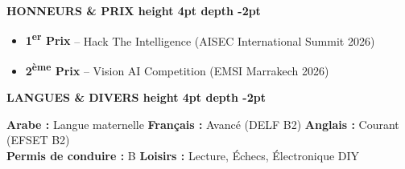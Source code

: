 \documentclass[10pt,a4paper]{altacv}
\renewcommand{\cvsection}[2][]{%
  \medskip%
  {\color{heading}\LARGE\bfseries #2 \hspace{0.2em}\leaders\vrule height 4pt depth -2pt\hfill\mbox{}}\par\smallskip
}
\begin{document}
\cvsection{HONNEURS \& PRIX}
\begin{itemize}
  \item \textbf{1\textsuperscript{er} Prix} -- Hack The Intelligence (AISEC International Summit 2026)
  \item \textbf{2\textsuperscript{ème} Prix} -- Vision AI Competition (EMSI Marrakech 2026)
\end{itemize}


\cvsection{LANGUES \& DIVERS}
\textbf{Arabe :} Langue maternelle \hfill \textbf{Français :} Avancé (DELF B2) \hfill \textbf{Anglais :} Courant (EFSET B2)\\[2pt]
\textbf{Permis de conduire :} B \hfill \textbf{Loisirs :} Lecture, Échecs, Électronique DIY
\end{document}
